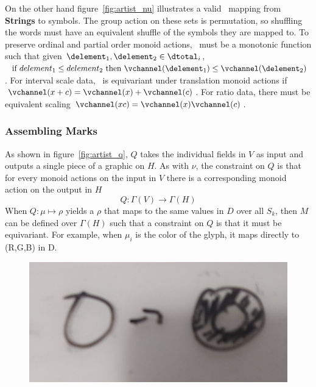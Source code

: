 \documentclass[../main.tex]{subfiles}
\begin{document}
On the other hand figure~\ref{fig:artist_nu} illustrates a valid \vchannel\ mapping from \textbf{Strings} to symbols. The group action on these sets is permutation, so shuffling the words must have an equivalent shuffle of the symbols they are mapped to. To preserve ordinal and partial order monoid actions, \vchannel\ must be a monotonic function such that given $\delement_1, \delement_2 \in \dtotal_{i}$, $\text{ if } delement_1 \leq delement_2 \text{ then } \vchannel (\delement_1) \leq \vchannel(\delement_2)$. For interval scale data, \vchannel\ is equivariant under translation monoid actions if $\vchannel (x + c) = \vchannel(x) + \vchannel(c)$. For ratio data, there must be equivalent scaling $ \vchannel(xc) = \vchannel(x)\vchannel(c)$.

\subsubsection{Assembling Marks}
\label{sec:artist_q}

As shown in figure~\ref{fig:artist_q}, $Q$ takes the individual fields in $V$ as input and outputs a single piece of a graphic on $H$. As with $\nu$, the constraint on $Q$ is that for every monoid actions on the input in $V$ there is a corresponding monoid action on the output in $H$
\begin{equation}
    Q: \Gamma(V) \rightarrow \Gamma(H)
\end{equation}
When $Q: \mu \mapsto \rho$ yields a $\rho$ that maps to the same values in $D$ over all $S_k$, then $M$ can be defined over $\Gamma(H)$ such that a constraint on $Q$ is that it must be equivariant. For example, when $\mu_{i}$ is the color of the glyph, it maps directly to (R,G,B) in D.

\begin{figure}[H]
    \includegraphics[width=\textwidth]{figures/math/diff_type_q.png}
    \label{fig:artist_mark_change}
\end{figure}
\end{document}

